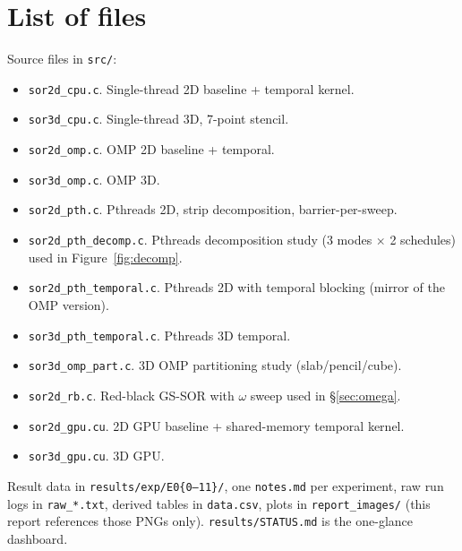 \documentclass[11pt]{article}
\begin{document}
\section*{List of files}

Source files in \texttt{src/}:

\begin{itemize}[leftmargin=1.4em,itemsep=1pt,topsep=1pt]
  \item \texttt{sor2d\_cpu.c}. Single-thread 2D baseline + temporal
        kernel.
  \item \texttt{sor3d\_cpu.c}. Single-thread 3D, 7-point stencil.
  \item \texttt{sor2d\_omp.c}. OMP 2D baseline + temporal.
  \item \texttt{sor3d\_omp.c}. OMP 3D.
  \item \texttt{sor2d\_pth.c}. Pthreads 2D, strip decomposition,
        barrier-per-sweep.
  \item \texttt{sor2d\_pth\_decomp.c}. Pthreads decomposition study
        (3 modes $\times$ 2 schedules) used in
        Figure~\ref{fig:decomp}.
  \item \texttt{sor2d\_pth\_temporal.c}. Pthreads 2D with temporal
        blocking (mirror of the OMP version).
  \item \texttt{sor3d\_pth\_temporal.c}. Pthreads 3D temporal.
  \item \texttt{sor3d\_omp\_part.c}. 3D OMP partitioning study
        (slab/pencil/cube).
  \item \texttt{sor2d\_rb.c}. Red-black GS-SOR with $\omega$ sweep
        used in §\ref{sec:omega}.
  \item \texttt{sor2d\_gpu.cu}. 2D GPU baseline + shared-memory
        temporal kernel.
  \item \texttt{sor3d\_gpu.cu}. 3D GPU.
\end{itemize}

\noindent Result data in \texttt{results/exp/E0\{0--11\}/}, one
\texttt{notes.md} per experiment, raw run logs in
\texttt{raw\_*.txt}, derived tables in \texttt{data.csv}, plots in
\texttt{report\_images/} (this report references those PNGs only).
\texttt{results/STATUS.md} is the one-glance dashboard.
\end{document}
